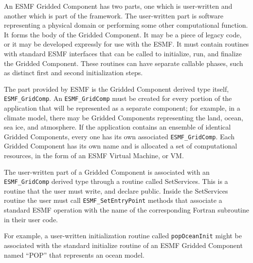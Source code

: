 An ESMF Gridded Component has two parts, one which is user-written
and another which is part of the framework.  The user-written
part is software representing a physical domain or performing some
other computational function.  It forms the body of the Gridded 
Component.  It may be a piece of legacy code, or it may be developed 
expressly for use with the ESMF.  It must contain routines with
standard ESMF interfaces that can be called to initialize, run, and
finalize the Gridded Component.  These routines can have separate 
callable phases, such as distinct first and second initialization steps.

The part provided by ESMF is the Gridded Component derived type 
itself, {\tt ESMF\_GridComp}.  An {\tt ESMF\_GridComp} must be created 
for every portion of the application that will be represented 
as a separate component; for example, in a climate model, there may 
be Gridded Components representing the land, ocean, sea ice, and 
atmosphere.  If the application contains an ensemble of identical 
Gridded Components, every one has its own associated {\tt ESMF\_GridComp}.
Each Gridded Component has its own name and is allocated
a set of computational resources, in the form of an ESMF Virtual
Machine, or VM.

The user-written part of a Gridded Component is associated with an
{\tt ESMF\_GridComp} derived type through a routine called SetServices.
This is a routine that the user must write, and declare public.
Inside the SetServices routine the user must call  
{\tt ESMF\_SetEntryPoint} methods that associate a standard ESMF 
operation with the name of the corresponding Fortran subroutine in their user code.  

For example, a user-written initialization routine called {\tt popOceanInit} 
might be associated with the standard initialize routine of an ESMF 
Gridded Component named ``POP'' that represents an ocean model.








